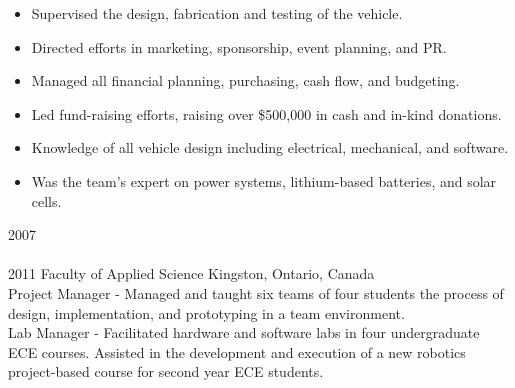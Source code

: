 \begin{entrylist}
{\begin{itemize}[leftmargin=12pt]
    \item Supervised the design, fabrication and testing of the vehicle.
    \item Directed efforts in marketing, sponsorship, event planning, and PR.
    \item Managed all financial planning, purchasing, cash flow, and budgeting.
    \item Led fund-raising efforts, raising over \$500,000 in cash and in-kind donations.
    \item Knowledge of all vehicle design including electrical, mechanical, and software.
    \item Was the team’s expert on power systems, lithium-based batteries, and solar cells.
  \end{itemize}
}
\entry
  {2007\\\faChevronDown\\2011}
  {Faculty of Applied Science}
  {Kingston, Ontario, Canada}
  {\\
  {\headingfont Project Manager} - Managed and taught six teams of four students the process of design, implementation, and prototyping in a team environment.\\
  {\headingfont Lab Manager} - Facilitated hardware and software labs in four undergraduate ECE courses. Assisted in the development and execution of a new robotics project-based course for second year ECE students.}
\end{entrylist}